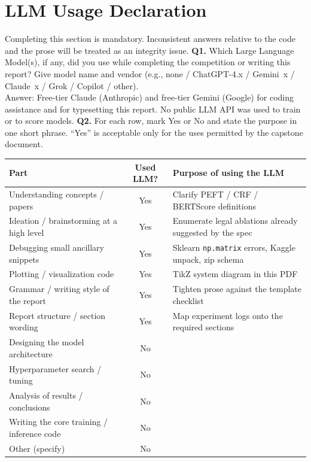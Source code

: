 \documentclass[11pt, oneside]{article}
\begin{document}
\section*{LLM Usage Declaration}
Completing this section is mandatory. Inconsistent answers relative to the code and the prose will be treated as an integrity issue.
\medskip
\noindent
\textbf{Q1.} Which Large Language Model(s), if any, did you use while completing the competition or writing this report? Give model name and vendor (e.g., none / ChatGPT-4.x / Gemini~x / Claude~x / Grok / Copilot / other). \\[0.6em]
Answer: Free-tier Claude (Anthropic) and free-tier Gemini (Google) for coding assistance and for typesetting this report. No public LLM API was used to train or to score models.
\medskip
\noindent
\textbf{Q2.} For each row, mark Yes or No and state the purpose in one short phrase. ``Yes'' is acceptable only for the uses permitted by the capstone document.
\begin{table}[H]
\centering
\small
\begin{tabular}{>{\raggedright\arraybackslash}p{5.0cm}|c|>{\raggedright\arraybackslash}p{6.6cm}}
\toprule
Part & Used LLM? & Purpose of using the LLM \\
\midrule
Understanding concepts / papers & Yes & Clarify PEFT / CRF / BERTScore definitions \\
Ideation / brainstorming at a high level & Yes & Enumerate legal ablations already suggested by the spec \\
Debugging small ancillary snippets & Yes & Sklearn \texttt{np.matrix} errors, Kaggle unpack, zip schema \\
Plotting / visualization code & Yes & TikZ system diagram in this PDF \\
Grammar / writing style of the report & Yes & Tighten prose against the template checklist \\
Report structure / section wording & Yes & Map experiment logs onto the required sections \\
Designing the model architecture & No & \\
Hyperparameter search / tuning & No & \\
Analysis of results / conclusions & No & \\
Writing the core training / inference code & No & \\
Other (specify) & No & \\
\bottomrule
\end{tabular}
\end{table}
\end{document}
